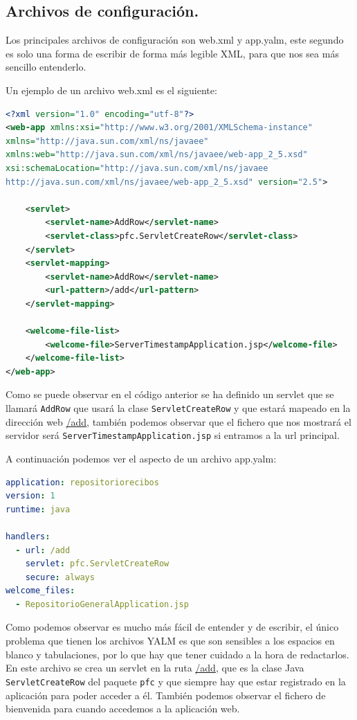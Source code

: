 \subsection{Archivos de configuración.\label{cap:refArchivosConfiguracionGoogleAppEngine}}
Los principales archivos de configuración son web.xml y app.yalm, este segundo es solo una forma de escribir de forma más legible XML, para que nos sea más sencillo entenderlo.

Un ejemplo de un archivo web.xml es el siguiente:

\begin{lstlisting}[language=XML]
<?xml version="1.0" encoding="utf-8"?>
<web-app xmlns:xsi="http://www.w3.org/2001/XMLSchema-instance"
xmlns="http://java.sun.com/xml/ns/javaee"
xmlns:web="http://java.sun.com/xml/ns/javaee/web-app_2_5.xsd"
xsi:schemaLocation="http://java.sun.com/xml/ns/javaee
http://java.sun.com/xml/ns/javaee/web-app_2_5.xsd" version="2.5">

	<servlet>
		<servlet-name>AddRow</servlet-name>
		<servlet-class>pfc.ServletCreateRow</servlet-class>
	</servlet>
	<servlet-mapping>
		<servlet-name>AddRow</servlet-name>
		<url-pattern>/add</url-pattern>
	</servlet-mapping>

	<welcome-file-list>
		<welcome-file>ServerTimestampApplication.jsp</welcome-file>
	</welcome-file-list>
</web-app>
\end{lstlisting}

Como se puede observar en el código anterior se ha definido un servlet que se llamará \lstinline{AddRow} que usará la clase \lstinline{ServletCreateRow} y que estará mapeado en la dirección web \url{/add}, también podemos observar que el fichero que nos mostrará el servidor será \lstinline{ServerTimestampApplication.jsp} si entramos a la url principal.

A continuación podemos ver el aspecto de un archivo app.yalm:

\begin{lstlisting}[language=YAML]
application: repositoriorecibos
version: 1
runtime: java

handlers:
  - url: /add
    servlet: pfc.ServletCreateRow
    secure: always
welcome_files:
  - RepositorioGeneralApplication.jsp
\end{lstlisting}

Como podemos observar es mucho más fácil de entender y de escribir, el único problema que tienen los archivos YALM es que son sensibles a los espacios en blanco y tabulaciones, por lo que hay que tener cuidado a la hora de redactarlos. En este archivo se crea un servlet en la ruta \url{/add}, que es la clase Java \lstinline{ServletCreateRow} del paquete \lstinline{pfc} y que siempre hay que estar registrado en la aplicación para poder acceder a él. También podemos observar el fichero de bienvenida para cuando accedemos a la aplicación web. 

